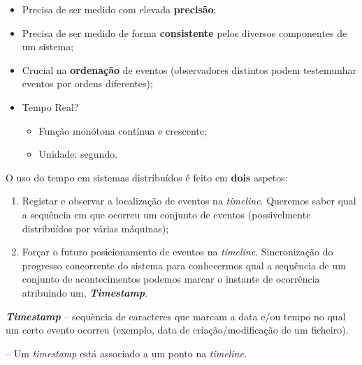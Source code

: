 \documentclass{article}
\begin{document}
\begin{itemize}
	\item Precisa de ser medido com elevada \textbf{precisão};
	\item Precisa de ser medido de forma \textbf{consistente} pelos diversos componentes de um sistema;
	\item Crucial na \textbf{ordenação} de eventos (observadores distintos podem testemunhar eventos por ordens diferentes);
	\item Tempo Real?
		\begin{itemize}
			\item Função monótona contínua e crescente;
			\item Unidade: segundo.
		\end{itemize}
\end{itemize}

O uso do tempo em sistemas distribuídos é feito em \textbf{dois} aspetos:

\begin{enumerate}
	\item Registar e observar a localização de eventos na \textit{timeline}. Queremos saber qual a sequência em que ocorreu um conjunto de eventos (possivelmente distribuídos por várias máquinas);
	\item Forçar o futuro posicionamento de eventos na \textit{timeline}. Sincronização do progresso concorrente do sistema para conhecermos qual a sequência de um conjunto de acontecimentos podemos marcar o instante de ocorrência atribuindo um, \textbf{\textit{Timestamp}}.
\end{enumerate}

\textit{\textbf{Timestamp}} -- sequència de caracteres que marcam a data e/ou tempo no qual um certo evento ocorreu (exemplo, data de criação/modificação de um ficheiro).

-- Um \textit{timestamp} está associado a um ponto na \textit{timeline}.
\end{document}
